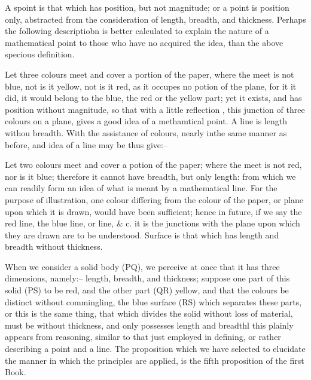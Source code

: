     A spoint is that which has position, but not magnitude; or a point is position only, abstracted from the consideration of length, breadth, and thickness. Perhaps the following descriptiobn is better calculated to explain the nature of a mathematical point to those who have no acquired the idea, than the above specious definition. 

    Let three colours meet and cover a portion of the paper, where the meet is not blue, not is it yellow, not is it red, as it occupes no potion of the plane, for it it did, it would belong to the blue, the red or the yellow part; yet it exists, and has position without magnitude, so that with a little reflection , this junction of three colours on a plane, gives a good idea of a methamtical point. 
    A line is length withou breadth. With the assistance of colours, nearly inthe same manner as before, and idea of a line may be thus give:--

    Let two colours meet and cover a potion of the paper; where the meet is not red, nor is it blue; therefore it cannot have breadth, but only length: from which we can readily form an idea of what is meant by a mathematical line. For the purpose of illustration, one colour differing from the colour of the paper, or plane upon which it is drawn, would have been sufficient; hence in future, if we say the red line, the blue line, or line, \& c. it is the junctions with the plane upon which they are drawn are to be understood. 
    Surface is that which has length and breadth without thickness. 

    When we consider a solid body (PQ), we perceive at once that it has three dimensions, namely:-- length, breadth, and thickness; suppose one part of this solid (PS) to be red, and the other part (QR) yellow, and that the colours be distinct without commingling, the blue surface (RS) which separates these parts, or this is the same thing, that which divides the solid without loss of material, must be without thickness, and only possesses length and breadthl this plainly appears from reasoning, similar to that just employed in defining, or rather describing a point and a line. 
    The proposition which we have selected to elucidate the manner in which the principles are applied, is the fifth proposition of the first Book. 







